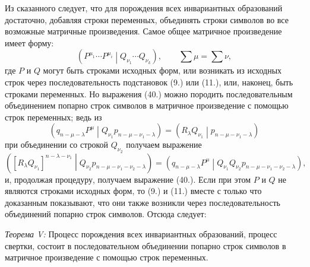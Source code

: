 \documentclass[11pt]{article}
\newcommand{\pair}[2]{\left(#1\middle|#2\right)}
\begin{document}
Из сказанного следует, что для порождения всех инвариантных образований достаточно, добавляя строки переменных, объединять строки символов во все возможные матричные произведения. Самое общее матричное произведение имеет форму:
\begin{equation}
 \pair{P^{\mu_1}\cdots P^{\mu_i}}{Q_{\nu_1}\cdots Q_{\nu_k}},
 \qquad \sum\mu=\sum\nu,
\tag{40}
\end{equation}
где $P$ и $Q$ могут быть строками исходных форм, или возникать из исходных строк через последовательность подстановок (9.) или (11.), или, наконец, быть строками переменных. Но выражения (40.) можно породить последовательным объединением попарно строк символов в матричное произведение с помощью строк переменных; ведь из
\[
 \pair{q_{n-\mu-\lambda}P^\mu}{Q_{\nu_1}p_{n-\mu-\nu_1-\lambda}}
 =\pair{R_\lambda Q_{\nu_1}}{p_{n-\mu-\nu_1-\lambda}}
\]
при объединении со строкой $Q_{\nu_2}$ получаем выражение
\[
 \pair{[R_\lambda Q_{\nu_1}]^{n-\lambda-\nu_1}}
 {Q_{\nu_2}p_{n-\mu-\nu_1-\nu_2-\lambda}}
 =\pair{q_{n-\mu-\lambda}P^\mu}
 {Q_{\nu_1}Q_{\nu_2}p_{n-\mu-\nu_1-\nu_2-\lambda}},
\]
и, продолжая процедуру, получаем выражение (40.). Если при этом $P$ и $Q$ не являются строками исходных форм, то (9.) и (11.) вместе с только что доказанным показывают, что они также возникли через последовательность объединений попарно строк символов. Отсюда следует:

\emph{Теорема V:} Процесс порождения всех инвариантных образований, процесс свертки, состоит в последовательном объединении попарно строк символов в матричное произведение с помощью строк переменных.
\end{document}
